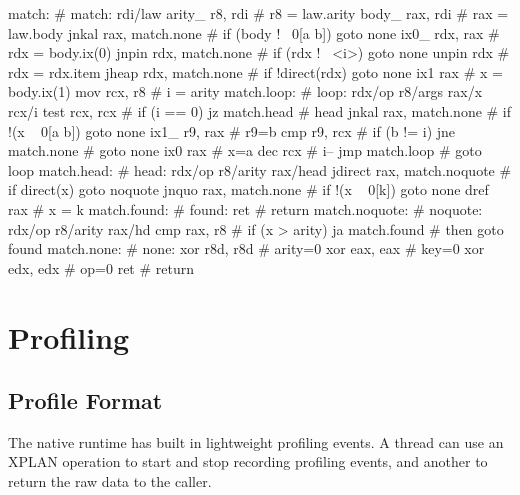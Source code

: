 \begin{asm}
match:                                      # match: rdi/law
	arity_	r8, rdi                     #   r8  = law.arity
	body_	rax, rdi                    #   rax = law.body
	jnkal	rax, match.none             #   if (body !~ 0[a b]) goto none
	ix0_	rdx, rax                    #   rdx = body.ix(0)
	jnpin	rdx, match.none             #   if (rdx !~ <i>) goto none
	unpin	rdx                         #   rdx = rdx.item
	jheap	rdx, match.none             #   if !direct(rdx) goto none
	ix1	rax                         #   x = body.ix(1)
	mov	rcx, r8                     #   i = arity
match.loop:                                 # loop: rdx/op r8/args rax/x rcx/i
	test	rcx, rcx                    #   if (i == 0)
	jz	match.head                  #     head
	jnkal	rax, match.none             #   if !(x ~ 0[a b]) goto none
	ix1_	r9, rax                     #   r9=b
	cmp	r9, rcx                     #   if (b != i)
	jne	match.none                  #     goto none
	ix0	rax                         #   x=a
	dec	rcx                         #   i--
	jmp	match.loop                  #   goto loop
match.head:                                 # head: rdx/op r8/arity rax/head
	jdirect	rax, match.noquote          #   if direct(x) goto noquote
	jnquo	rax, match.none             #   if !(x ~ 0[k]) goto none
	dref	rax                         #   x = k
match.found:                                # found:
	ret                                 #   return
match.noquote:                              # noquote: rdx/op r8/arity rax/hd
	cmp	rax, r8                     #   if (x > arity)
	ja	match.found                 #     then goto found
match.none:                                 # none:
	xor	r8d, r8d                    #   arity=0
	xor	eax, eax                    #   key=0
	xor	edx, edx                    #   op=0
	ret                                 #   return
\end{asm}

\section{Profiling}

\subsection{Profile Format}

The native runtime has built in lightweight profiling events. A thread can use
an XPLAN operation to start and stop recording profiling events, and another to
return the raw data to the caller.


